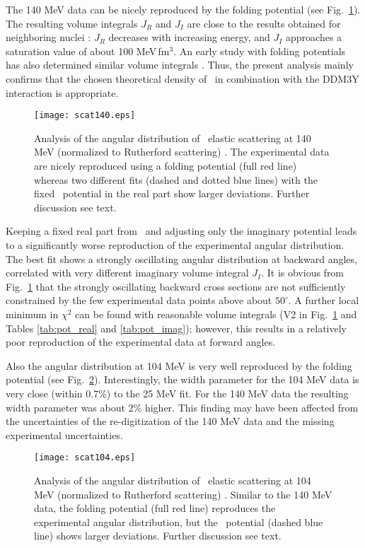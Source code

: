 The 140 MeV data can be nicely reproduced by the folding potential (see
Fig.~\ref{fig:scat140}). The resulting volume integrals $J_R$ and $J_I$ are
close to the results obtained for neighboring nuclei \cite{Atz96}: $J_R$
decreases with increasing energy, and $J_I$ approaches a saturation value of
about 100 MeV\,fm$^3$.  An early study with folding potentials has also
determined similar volume integrals \cite{Kob84b}. Thus, the present analysis
mainly confirms that the chosen theoretical density of \tinull\ in combination
with the DDM3Y interaction is appropriate.
%
\begin{figure}[htb]
  \texttt{[image: scat140.eps]}
\caption{ 
Analysis of the angular distribution of \tinull \raa \tinull\ elastic
scattering at 140 MeV (normalized to Rutherford scattering)
\cite{Rob78,EXFOR}. The experimental data are nicely reproduced using a
folding potential (full red line) whereas two different fits (dashed and
dotted blue lines) with the fixed \SM\ potential in the real part show larger
deviations. Further discussion see text.
}
\label{fig:scat140}
\end{figure}
%

Keeping a fixed real part from \SM\ and adjusting only the imaginary potential
leads to a significantly worse reproduction of the experimental angular
distribution. The best fit shows a strongly oscillating angular distribution
at backward angles, correlated with very different imaginary volume integral
$J_I$. It is obvious from Fig.~\ref{fig:scat140} that the strongly oscillating
backward cross sections are not sufficiently constrained by the few
experimental data points above about $50^\circ$. A further local minimum in
$\chi^2$ can be found with reasonable volume integrals (V2 in
Fig.~\ref{fig:scat140} and Tables \ref{tab:pot_real} and \ref{tab:pot_imag});
however, this results in a relatively poor reproduction of the experimental
data at forward angles.

Also the angular distribution at 104 MeV \cite{Pesl83} is very well reproduced
by the folding potential (see Fig.~\ref{fig:scat104}). Interestingly, the
width parameter for the 104 MeV data is very close (within 0.7\%) to the 25
MeV fit. For the 140 MeV data the resulting width parameter was about 2\%
higher. This finding may have been affected from the uncertainties of the
re-digitization of the 140 MeV data and the missing experimental
uncertainties.
%
\begin{figure}[htb]
  \texttt{[image: scat104.eps]}
\caption{
Analysis of the angular distribution of \tinull \raa \tinull\ elastic
scattering at 104 MeV (normalized to Rutherford scattering)
\cite{Pesl83,EXFOR}. Similar to the 140 MeV data, the folding potential (full
red line) reproduces the experimental angular distribution, but the
\SM\ potential (dashed blue line) shows larger deviations. Further discussion
see text.
}
\label{fig:scat104}
\end{figure}
%

